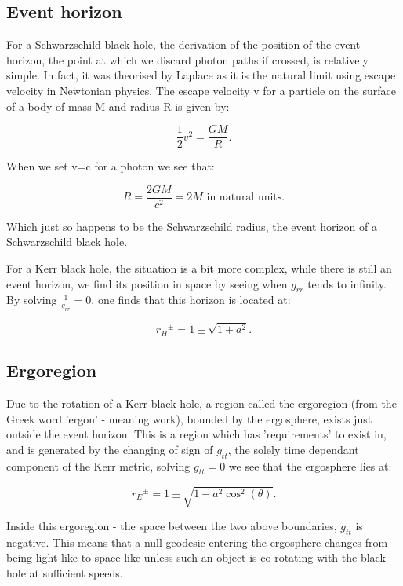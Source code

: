 \documentclass[oneside,openright,frontopenright, singlespacing]{dmathesis}
\begin{document}
\subsection{Event horizon}\label{subsec:Subsection4.3.1}

	For a Schwarzschild black hole, the derivation of the position of the event horizon, the point at which we discard photon paths if crossed, is relatively simple. In fact, it was theorised by Laplace as it is the natural limit using escape velocity in Newtonian physics. The escape velocity v for a particle on the surface of a body of mass M and radius R is given by:

	\[\frac{1}{2}v^2 = \frac{GM}{R}.\]

\vspace{1em}
	When we set v=c for a photon we see that:

	\[R = \frac{2GM}{c^2} = 2M \mbox{ in natural units}.\]

\vspace{1em}
	Which just so happens to be the Schwarzschild radius, the event horizon of a Schwarzschild black hole.

\vspace{1em}
	For a Kerr black hole, the situation is a bit more complex, while there is still an event horizon, we find its position in space by seeing when $g_{rr}$ tends to infinity. By solving $\frac{1}{g_{rr}}=0$, one finds that this horizon is located at:

	\[{r_{H}}^{\pm} = 1\pm\sqrt{1+a^2}.\]

\subsection{Ergoregion}\label{subsec:Subsection4.3.2}

	Due to the rotation of a Kerr black hole, a region called the ergoregion (from the Greek word 'ergon' - meaning work), bounded by the ergosphere, exists just outside the event horizon. This is a region which has 'requirements' to exist in, and is generated by the changing of sign of $g_{tt}$, the solely time dependant component of the Kerr metric, solving $g_{tt}=0$ we see that the ergosphere lies at:

	\[{r_{E}}^{\pm} = 1\pm\sqrt{1-a^2\cos^2(\theta)}.\]

\vspace{1em}
	Inside this ergoregion - the space between the two above boundaries, $g_{tt}$ is negative. This means that a null geodesic entering the ergosphere changes from being light-like to space-like unless such an object is co-rotating with the black hole at sufficient speeds.
\end{document}
